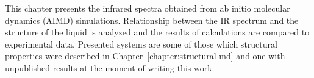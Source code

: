 \label{chapter:ir-spectra}

This chapter presents the infrared spectra obtained from ab initio molecular dynamics (AIMD) simulations. Relationship between the IR spectrum and the structure of the liquid is analyzed and the results of calculations are compared to experimental data. Presented systems are some of those which structural properties were described in Chapter~\ref{chapter:structural-md} and one with unpublished results at the moment of writing this work.